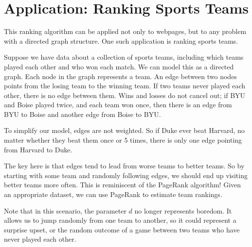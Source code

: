 \section*{Application: Ranking Sports Teams}
This ranking algorithm can be applied not only to webpages, but to any problem with a directed graph structure.
One such application is ranking sports teams.

Suppose we have data about a collection of sports teams, including which teams played each other and who won each match.
We can model this as a directed graph. Each node in the graph represents a team.
An edge between two nodes points from the losing team to the winning team.
If two teams never played each other, there is no edge between them.
Wins and losses do not cancel out; if BYU and Boise played twice, and each team won once, then there is an edge from BYU to Boise and another edge from Boise to BYU. 

To simplify our model, edges are not weighted. So if Duke ever beat Harvard, no matter whether they beat them once or 5 times, there is only one edge pointing from Harvard to Duke.

The key here is that edges tend to lead from worse teams to better teams.
So by starting with some team and randomly following edges, we should end up visiting better teams more often.
This is reminiscent of the PageRank algorithm! Given an appropriate dataset, we can use PageRank to estimate team rankings.

Note that in this scenario, the parameter $d$ no longer represents boredom.
It allows us to jump randomly from one team to another, so it could represent a surprise upset, or the random outcome of a game between two teams who have never played each other.

